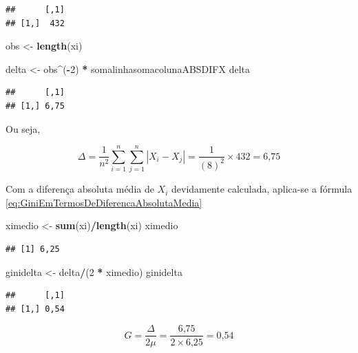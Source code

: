 \documentclass[
]{book}
\newenvironment{Shaded}{\begin{snugshade}}{\end{snugshade}}
\newcommand{\DecValTok}[1]{\textcolor[rgb]{0.00,0.00,0.81}{#1}}
\newcommand{\KeywordTok}[1]{\textcolor[rgb]{0.13,0.29,0.53}{\textbf{#1}}}
\newcommand{\NormalTok}[1]{#1}
\newcommand{\OperatorTok}[1]{\textcolor[rgb]{0.81,0.36,0.00}{\textbf{#1}}}
\newcommand{\StringTok}[1]{\textcolor[rgb]{0.31,0.60,0.02}{#1}}
\begin{document}
\begin{verbatim}
##      [,1]
## [1,]  432
\end{verbatim}

\begin{Shaded}
\begin{Highlighting}[]
\NormalTok{obs <-}\StringTok{ }\KeywordTok{length}\NormalTok{(xi)}

\NormalTok{delta <-}\StringTok{ }\NormalTok{obs}\OperatorTok{^}\NormalTok{(}\OperatorTok{-}\DecValTok{2}\NormalTok{) }\OperatorTok{*}\StringTok{ }\NormalTok{somalinhasomacolunaABSDIFX}
\NormalTok{delta}
\end{Highlighting}
\end{Shaded}

\begin{verbatim}
##      [,1]
## [1,] 6,75
\end{verbatim}

Ou seja,

\[
\Delta = \dfrac{1}{n^2}\sum_{i=1}^{n}\sum_{j=1}^{n}|X_i - X_j| = \dfrac{1}{(\text{8})^2} \times \text{432} = \text{6,75}
\]

Com a diferença absoluta média de \(X_i\) devidamente calculada, aplica-se a fórmula \eqref{eq:GiniEmTermosDeDiferencaAbsolutaMedia}

\begin{Shaded}
\begin{Highlighting}[]
\NormalTok{ximedio <-}\StringTok{ }\KeywordTok{sum}\NormalTok{(xi)}\OperatorTok{/}\KeywordTok{length}\NormalTok{(xi)}
\NormalTok{ximedio}
\end{Highlighting}
\end{Shaded}

\begin{verbatim}
## [1] 6,25
\end{verbatim}

\begin{Shaded}
\begin{Highlighting}[]
\NormalTok{ginidelta <-}\StringTok{ }\NormalTok{delta}\OperatorTok{/}\NormalTok{(}\DecValTok{2} \OperatorTok{*}\StringTok{ }\NormalTok{ximedio)}
\NormalTok{ginidelta}
\end{Highlighting}
\end{Shaded}

\begin{verbatim}
##      [,1]
## [1,] 0,54
\end{verbatim}

\[
  G = \dfrac{\Delta}{2\mu} = \dfrac{\text{6,75}}{2 \times \text{6,25}} = \text{0,54}
\]
\end{document}
